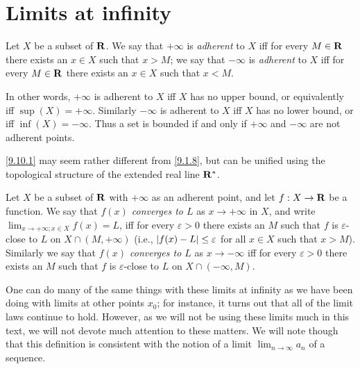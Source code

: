 \section{Limits at infinity}\label{sec 9.10}

\begin{definition}\label{9.10.1}
  Let \(X\) be a subset of \(\mathbf{R}\).
  We say that \(+\infty\) is \emph{adherent} to \(X\) iff for every \(M \in \mathbf{R}\) there exists an \(x \in X\) such that \(x > M\);
  we say that \(-\infty\) is \emph{adherent} to \(X\) iff for every \(M \in \mathbf{R}\) there exists an \(x \in X\) such that \(x < M\).
\end{definition}

\begin{note}
  In other words, \(+\infty\) is adherent to \(X\) iff \(X\) has no upper bound, or equivalently iff \(\sup(X) = +\infty\).
  Similarly \(-\infty\) is adherent to \(X\) iff \(X\) has no lower bound, or iff \(\inf(X) = -\infty\).
  Thus a set is bounded if and only if \(+\infty\) and \(-\infty\) are not adherent points.
\end{note}

\begin{remark}\label{9.10.2}
  \cref{9.10.1} may seem rather different from \cref{9.1.8}, but can be unified using the topological structure of the extended real line \(\mathbf{R}^*\).
\end{remark}

\begin{definition}\label{9.10.3}
  Let \(X\) be a subset of \(\mathbf{R}\) with \(+\infty\) as an adherent point, and let \(f : X \to \mathbf{R}\) be a function.
  We say that \emph{\(f(x)\) converges to \(L\)} as \(x \to +\infty\) in \(X\), and write \(\lim_{x \to +\infty ; x \in X} f(x) = L\), iff for every \(\varepsilon > 0\) there exists an \(M\) such that \(f\) is \(\varepsilon\)-close to \(L\) on \(X \cap (M, +\infty)\)
  (i.e., \(\left\lvert f(x) - L\right\rvert \leq \varepsilon\) for all \(x \in X\) such that \(x > M\)).
  Similarly we say that \emph{\(f(x)\) converges to \(L\)} as \(x \to -\infty\) iff for every \(\varepsilon > 0\) there exists an \(M\) such that \(f\) is \(\varepsilon\)-close to \(L\) on \(X \cap (-\infty, M)\).
\end{definition}

\begin{note}
  One can do many of the same things with these limits at infinity as we have been doing with limits at other points \(x_0\);
  for instance, it turns out that all of the limit laws continue to hold.
  However, as we will not be using these limits much in this text, we will not devote much attention to these matters.
  We will note though that this definition is consistent with the notion of a limit \(\lim_{n \to \infty} a_n\) of a sequence.
\end{note}

